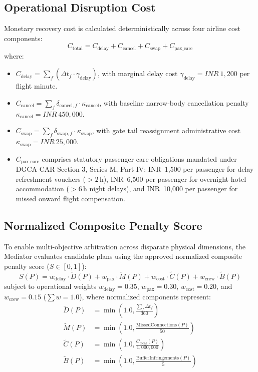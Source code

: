 \subsection{Operational Disruption Cost}
Monetary recovery cost is calculated deterministically across four airline cost components:
\begin{equation}
    C_{\text{total}} = C_{\text{delay}} + C_{\text{cancel}} + C_{\text{swap}} + C_{\text{pax\_care}}
\end{equation}
where:
\begin{itemize}
    \item $C_{\text{delay}} = \sum_{f} (\Delta t_f \cdot \gamma_{\text{delay}})$, with marginal delay cost $\gamma_{\text{delay}} = INR~1,200$ per flight minute.
    \item $C_{\text{cancel}} = \sum_{f} \delta_{\text{cancel}, f} \cdot \kappa_{\text{cancel}}$, with baseline narrow-body cancellation penalty $\kappa_{\text{cancel}} = INR~450,000$.
    \item $C_{\text{swap}} = \sum_{f} \delta_{\text{swap}, f} \cdot \kappa_{\text{swap}}$, with gate tail reassignment administrative cost $\kappa_{\text{swap}} = INR~25,000$.
    \item $C_{\text{pax\_care}}$ comprises statutory passenger care obligations mandated under DGCA CAR Section 3, Series M, Part IV: INR~1,500 per passenger for delay refreshment vouchers ($>2\,$h), INR~6,500 per passenger for overnight hotel accommodation ($>6\,$h night delays), and INR~10,000 per passenger for missed onward flight compensation.
\end{itemize}

\subsection{Normalized Composite Penalty Score}
To enable multi-objective arbitration across disparate physical dimensions, the Mediator evaluates candidate plans using the approved normalized composite penalty score ($S \in [0, 1]$):
\begin{equation}
    S(P) = w_{\text{delay}} \cdot \tilde{D}(P) + w_{\text{pax}} \cdot \tilde{M}(P) + w_{\text{cost}} \cdot \tilde{C}(P) + w_{\text{crew}} \cdot \tilde{B}(P)
\end{equation}
subject to operational weights $w_{\text{delay}} = 0.35$, $w_{\text{pax}} = 0.30$, $w_{\text{cost}} = 0.20$, and $w_{\text{crew}} = 0.15$ ($\sum w = 1.0$), where normalized components represent:
\begin{align}
    \tilde{D}(P) &= \min\left(1.0, \frac{\sum_f \Delta t_f}{360}\right) \\
    \tilde{M}(P) &= \min\left(1.0, \frac{\text{MissedConnections}(P)}{50}\right) \\
    \tilde{C}(P) &= \min\left(1.0, \frac{C_{\text{total}}(P)}{1,000,000}\right) \\
    \tilde{B}(P) &= \min\left(1.0, \frac{\text{BufferInfringements}(P)}{5}\right)
\end{align}

